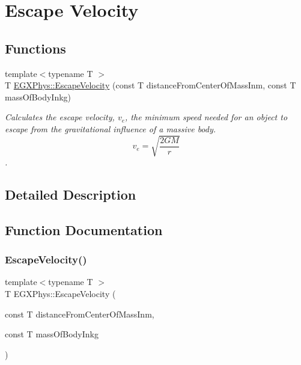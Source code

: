 \hypertarget{group___e_g_x_phys-_astrophysics-_escape_velocity}{}\section{Escape Velocity}
\label{group___e_g_x_phys-_astrophysics-_escape_velocity}
\subsection*{Functions}
\begin{DoxyCompactItemize}
\item 
{\footnotesize template$<$typename T $>$ }\\T \mbox{\hyperlink{group___e_g_x_phys-_astrophysics-_escape_velocity_gaeb8c0c9e780f883ea33498f076b08cb9}{E\+G\+X\+Phys\+::\+Escape\+Velocity}} (const T distance\+From\+Center\+Of\+Mass\+Inm, const T mass\+Of\+Body\+Inkg)
\begin{DoxyCompactList}\small\item\em Calculates the escape velocity, $v_{e}$, the minimum speed needed for an object to escape from the gravitational influence of a massive body. \[v_{e}=\sqrt{\frac{2 G M}{r}}\]. \end{DoxyCompactList}\end{DoxyCompactItemize}


\subsection{Detailed Description}


\subsection{Function Documentation}
\mbox{\label{group___e_g_x_phys-_astrophysics-_escape_velocity_gaeb8c0c9e780f883ea33498f076b08cb9}} 
\subsubsection{\texorpdfstring{Escape\+Velocity()}{EscapeVelocity()}}
{\footnotesize\ttfamily template$<$typename T $>$ \\
T E\+G\+X\+Phys\+::\+Escape\+Velocity (\begin{DoxyParamCaption}\item[{const T}]{distance\+From\+Center\+Of\+Mass\+Inm,  }\item[{const T}]{mass\+Of\+Body\+Inkg }\end{DoxyParamCaption})}



